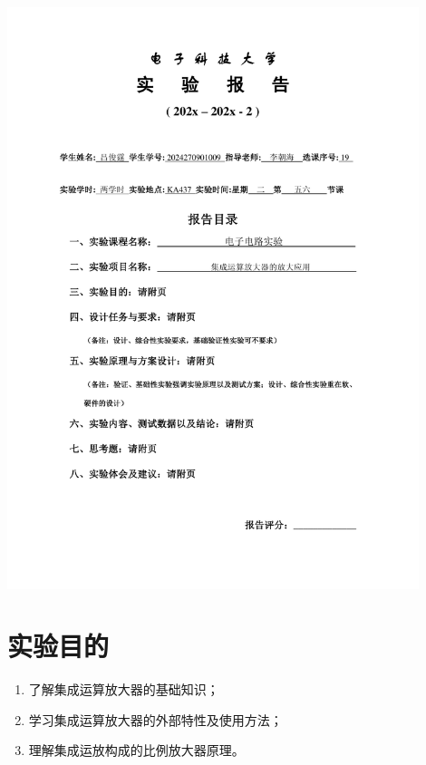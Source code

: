 \documentclass[10pt, a4paper]{article} %
\begin{document}
\begin{titlepage}
    \centering
    \includegraphics[page=1, width=0.9\textwidth, keepaspectratio]{image/实验报告撰写封面.pdf}
    \restoregeometry
\end{titlepage}

\setcounter{section}{2}

\section{实验目的}

\begin{enumerate}[leftmargin=50pt,label=(\arabic*)] %
    \item 了解集成运算放大器的基础知识；
    \item 学习集成运算放大器的外部特性及使用方法；
    \item 理解集成运放构成的比例放大器原理。
\end{enumerate}
\end{document}
